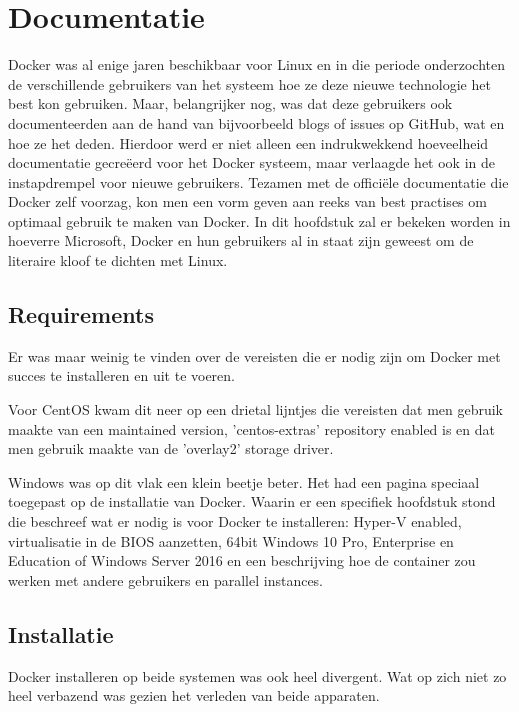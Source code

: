 
\chapter{Documentatie}
\label{ch:documentatie}

Docker was al enige jaren beschikbaar voor Linux en in die periode onderzochten de verschillende gebruikers van het systeem hoe ze deze nieuwe technologie het best kon gebruiken. Maar, belangrijker nog, was dat deze gebruikers ook documenteerden aan de hand van bijvoorbeeld blogs of issues op GitHub, wat en hoe ze het deden. Hierdoor werd er niet alleen een indrukwekkend hoeveelheid documentatie gecreëerd voor het Docker systeem, maar verlaagde het ook in de instapdrempel voor nieuwe gebruikers. Tezamen met de officiële documentatie die Docker zelf voorzag, kon men een vorm geven aan reeks van best practises om optimaal gebruik te maken van Docker. In dit hoofdstuk zal er bekeken worden in hoeverre Microsoft, Docker en hun gebruikers al in staat zijn geweest om de literaire kloof te dichten met Linux.

\section{Requirements}
Er was maar weinig te vinden over de vereisten die er nodig zijn om Docker met succes te installeren en uit te voeren.

Voor CentOS kwam dit neer op een drietal lijntjes die vereisten dat men gebruik maakte van een maintained version, 'centos-extras' repository enabled is en dat men gebruik maakte van de 'overlay2' storage driver.

Windows was op dit vlak een klein beetje beter. Het had een pagina speciaal toegepast op de installatie van Docker. Waarin er een specifiek hoofdstuk stond die beschreef wat er nodig is voor Docker te installeren: Hyper-V enabled, virtualisatie in de BIOS aanzetten, 64bit Windows 10 Pro, Enterprise en Education of Windows Server 2016 en een beschrijving hoe de container zou werken met andere gebruikers en parallel instances.

\section{Installatie}
Docker installeren op beide systemen was ook heel divergent. Wat op zich niet zo heel verbazend was gezien het verleden van beide apparaten.

